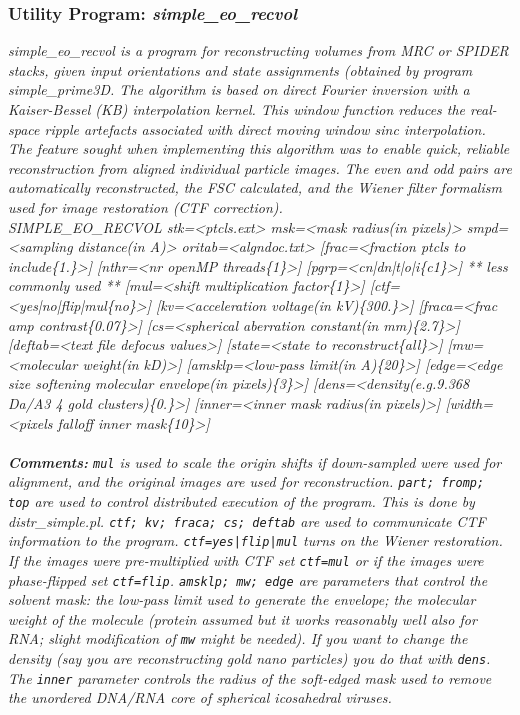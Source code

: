\documentclass[review]{elsarticle}
\begin{document}
\subsubsection{Utility Program: {\it{simple\_eo\_recvol}}}
\label{eo_recvol}
{\it{simple\_eo\_recvol} is a program for reconstructing volumes from MRC or SPIDER stacks, given input orientations and state assignments (obtained by program {\it{simple\_prime3D}}. The algorithm is based on direct Fourier inversion with a Kaiser-Bessel (KB) interpolation kernel. This window function reduces the real-space ripple artefacts associated with direct moving window sinc interpolation. The feature sought when implementing this algorithm was to enable quick, reliable reconstruction from aligned individual particle images. The even and odd pairs are automatically reconstructed, the FSC calculated, and the Wiener filter formalism used for image restoration (CTF correction).\\
{\it{SIMPLE\_EO\_RECVOL stk=<ptcls.ext> msk=<mask radius(in pixels)> smpd=<sampling}}
{\it{distance(in A)> oritab=<algndoc.txt> [frac=<fraction ptcls to include\{1.\}>]}}
{\it{[nthr=<nr openMP threads\{1\}>] [pgrp=<cn|dn|t|o|i\{c1\}>]}}
{\it{** less commonly used **}}
{\it{[mul=<shift multiplication factor\{1\}>] [ctf=<yes|no|flip|mul\{no\}>]}}
{\it{[kv=<acceleration voltage(in kV)\{300.\}>] [fraca=<frac amp contrast\{0.07\}>]}}
{\it{[cs=<spherical aberration constant(in mm)\{2.7\}>] [deftab=<text file defocus}}
{\it{values>] [state=<state to reconstruct\{all\}>] [mw=<molecular weight(in kD)>]}}
{\it{[amsklp=<low-pass limit(in A)\{20\}>] [edge=<edge size softening molecular}}
{\it{envelope(in pixels)\{3\}>] [dens=<density(e.g.9.368 Da/A3 4 gold}}
{\it{clusters)\{0.\}>] [inner=<inner mask radius(in pixels)>] [width=<pixels falloff}}
{\it{inner mask\{10\}>]}}
\\\\
\noindent\textbf{Comments:} \texttt{mul} is used to scale the origin shifts if down-sampled were used for alignment, and the original images are used for reconstruction. \texttt{part; fromp; top} are used to control distributed execution of the program. This is done by {\it{distr\_simple.pl}}.  \texttt{ctf; kv; fraca; cs; deftab} are used to communicate CTF information to the program. \texttt{ctf=yes|flip|mul} turns on the Wiener restoration. If the images were pre-multiplied with CTF set \texttt{ctf=mul} or if the images were phase-flipped set \texttt{ctf=flip}. \texttt{amsklp; mw; edge} are parameters that control the solvent mask: the low-pass limit used to generate the envelope; the molecular weight of the molecule (protein assumed but it works reasonably well also for RNA; slight modification of \texttt{mw} might be needed). If you want to change the density (say you are reconstructing gold nano particles) you do that with \texttt{dens}. The \texttt{inner} parameter controls the radius of the soft-edged mask used to remove the unordered DNA/RNA core of spherical icosahedral viruses.

}
\end{document}
